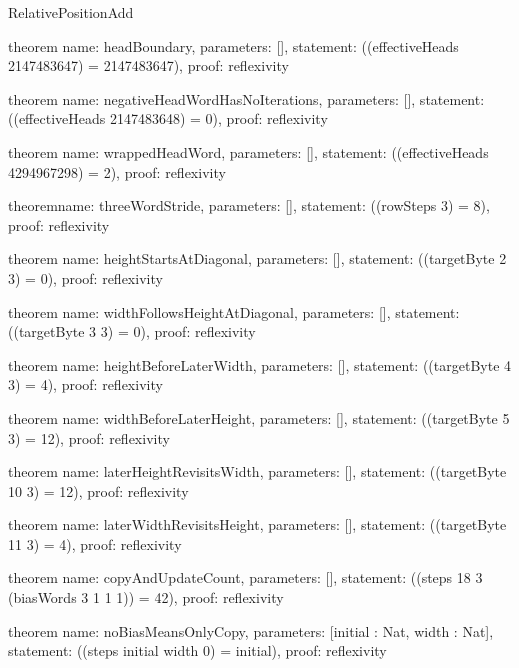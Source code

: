 \begin{lexlean}{RelativePositionAdd}
\begin{semanticmodule}
theorem{
  name: headBoundary,
  parameters: [],
  statement: ((effectiveHeads 2147483647) = 2147483647),
  proof: reflexivity{}
}

theorem{
  name: negativeHeadWordHasNoIterations,
  parameters: [],
  statement: ((effectiveHeads 2147483648) = 0),
  proof: reflexivity{}
}

theorem{
  name: wrappedHeadWord,
  parameters: [],
  statement: ((effectiveHeads 4294967298) = 2),
  proof: reflexivity{}
}

theorem{name: threeWordStride, parameters: [], statement: ((rowSteps 3) = 8), proof: reflexivity{}}

theorem{
  name: heightStartsAtDiagonal,
  parameters: [],
  statement: ((targetByte 2 3) = 0),
  proof: reflexivity{}
}

theorem{
  name: widthFollowsHeightAtDiagonal,
  parameters: [],
  statement: ((targetByte 3 3) = 0),
  proof: reflexivity{}
}

theorem{
  name: heightBeforeLaterWidth,
  parameters: [],
  statement: ((targetByte 4 3) = 4),
  proof: reflexivity{}
}

theorem{
  name: widthBeforeLaterHeight,
  parameters: [],
  statement: ((targetByte 5 3) = 12),
  proof: reflexivity{}
}

theorem{
  name: laterHeightRevisitsWidth,
  parameters: [],
  statement: ((targetByte 10 3) = 12),
  proof: reflexivity{}
}

theorem{
  name: laterWidthRevisitsHeight,
  parameters: [],
  statement: ((targetByte 11 3) = 4),
  proof: reflexivity{}
}

theorem{
  name: copyAndUpdateCount,
  parameters: [],
  statement: ((steps 18 3 (biasWords 3 1 1 1)) = 42),
  proof: reflexivity{}
}

theorem{
  name: noBiasMeansOnlyCopy,
  parameters: [initial : Nat, width : Nat],
  statement: ((steps initial width 0) = initial),
  proof: reflexivity{}
}
\end{semanticmodule}
\end{lexlean}
